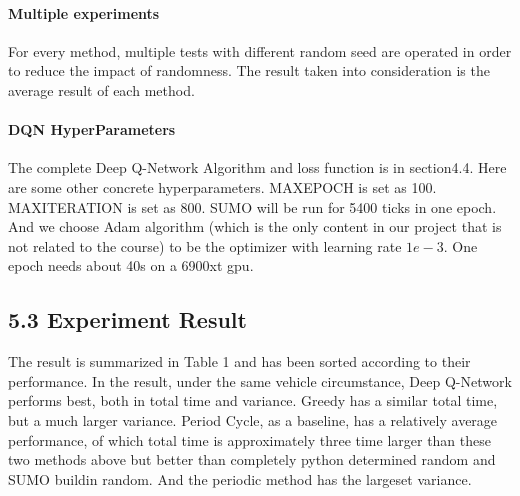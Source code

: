 \documentclass[letterpaper]{article} %
\begin{document}
\paragraph{Multiple experiments} For every method, multiple tests with different random seed are operated in order to reduce the impact of randomness. The result taken into consideration is the average result of each method.
\paragraph{DQN HyperParameters} The complete Deep Q-Network Algorithm and loss function is in section4.4. Here are some other concrete hyperparameters. MAXEPOCH is set as 100. MAXITERATION is set as 800. SUMO will be run for 5400 ticks in one epoch. And we choose Adam algorithm (which is the only content in our project that is not related to the course) to be the optimizer with learning rate $1e-3$. One epoch needs about 40s on a 6900xt gpu.

\subsection{5.3 Experiment Result}
\begin{table}[htbp]
	\centering
	\renewcommand\arraystretch{1.5}
	\caption{Results on different method}
\end{table}
The result is summarized in Table 1 and has been sorted according to their performance. In the result, under the same vehicle circumstance, Deep Q-Network performs best, both in total time and variance. Greedy has a similar total time, but a much larger variance. Period Cycle, as a baseline, has a relatively average performance, of which total time is approximately three time larger than these two methods above but better than completely python determined random and SUMO buildin random. And the periodic method has the largeset variance.
\end{document}
